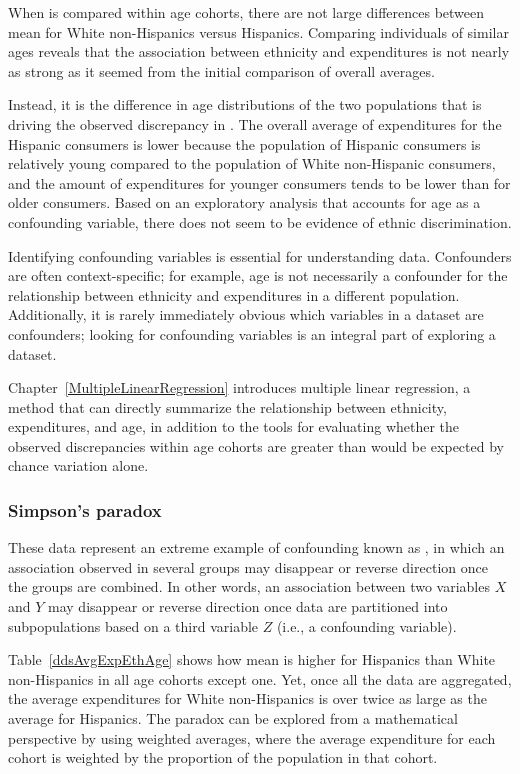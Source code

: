 When  is compared within age cohorts, there are not large differences between mean  for White non-Hispanics versus Hispanics. Comparing individuals of similar ages reveals that the association between ethnicity and expenditures is not nearly as strong as it seemed from the initial comparison of overall averages. 

Instead, it is the difference in age distributions of the two populations that is driving the observed discrepancy in . The overall average of expenditures for the Hispanic consumers is lower because the population of Hispanic consumers is relatively young compared to the population of White non-Hispanic consumers, and the amount of expenditures for younger consumers tends to be lower than for older consumers. Based on an exploratory analysis that accounts for age as a confounding variable, there does not seem to be evidence of ethnic discrimination. 

Identifying confounding variables is essential for understanding data. Confounders are often context-specific; for example, age is not necessarily a confounder for the relationship between ethnicity and expenditures in a different population. Additionally, it is rarely immediately obvious which variables in a dataset are confounders; looking for confounding variables is an integral part of exploring a dataset.

Chapter~\ref{MultipleLinearRegression} introduces multiple linear regression, a method that can directly summarize the relationship between ethnicity, expenditures, and age, in addition to the tools for evaluating whether the observed discrepancies within age cohorts are greater than would be expected by chance variation alone.

\subsubsection{Simpson's paradox}

These data represent an extreme example of confounding known as , in which an association observed in several groups may disappear or reverse direction once the groups are combined. In other words, an association between two variables $X$ and $Y$ may disappear or reverse direction once data are partitioned into subpopulations based on a third variable $Z$ (i.e., a confounding variable).

Table~\ref{ddsAvgExpEthAge} shows how mean  is higher for Hispanics than White non-Hispanics in all age cohorts except one. Yet, once all the data are aggregated, the average expenditures for White non-Hispanics is over twice as large as the average for Hispanics. The paradox can be explored from a mathematical perspective by using weighted averages, where the average expenditure for each cohort is weighted by the proportion of the population in that cohort.


